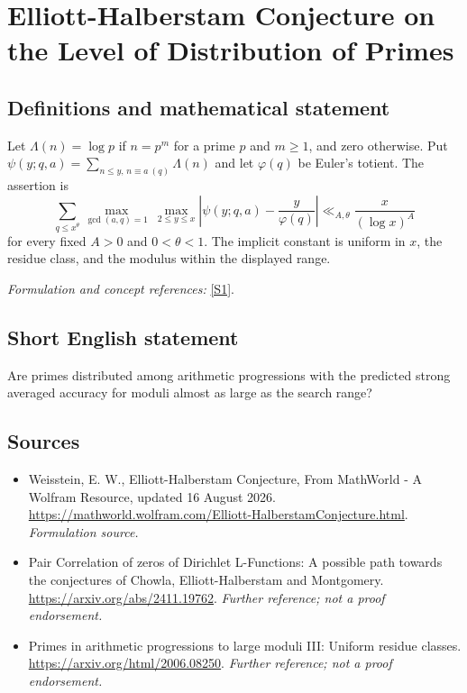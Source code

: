 \documentclass[11pt]{article}
\begin{document}
\section*{\texorpdfstring{Elliott-Halberstam Conjecture on the Level of Distribution of Primes}{Elliott-Halberstam Conjecture on the Level of Distribution of Primes}}\label{89}
\subsection{Definitions and mathematical statement}
Let $\Lambda(n)=\log p$ if $n=p^m$ for a prime $p$ and $m\ge1$, and zero otherwise. Put $\psi(y;q,a)=\sum_{n\le y,\,n\equiv a\ (q)}\Lambda(n)$ and let $\varphi(q)$ be Euler's totient. The assertion is
\[
 \sum_{q\le x^\theta}\max_{\gcd(a,q)=1}\ \max_{2\le y\le x}
 \left|\psi(y;q,a)-\frac{y}{\varphi(q)}\right|
 \ll_{A,\theta}\frac{x}{(\log x)^A}
\]
for every fixed $A>0$ and $0<\theta<1$. The implicit constant is uniform in $x$, the residue class, and the modulus within the displayed range.
\par\smallskip\textit{Formulation and concept references:} \href{https://mathworld.wolfram.com/Elliott-HalberstamConjecture.html}{[S1]}.

\subsection{Short English statement}
Are primes distributed among arithmetic progressions with the predicted strong averaged accuracy for moduli almost as large as the search range?
\subsection{Sources}
\begin{itemize}
\item[S1]Weisstein, E. W., Elliott-Halberstam Conjecture, From MathWorld - A Wolfram Resource, updated 16 August 2026.
\url{https://mathworld.wolfram.com/Elliott-HalberstamConjecture.html}.
\textit{Formulation source.}
\item[S2]Pair Correlation of zeros of Dirichlet L-Functions: A possible path towards the conjectures of Chowla, Elliott-Halberstam and Montgomery.
\url{https://arxiv.org/abs/2411.19762}.
\textit{Further reference; not a proof endorsement.}
\item[S3]Primes in arithmetic progressions to large moduli III: Uniform residue classes.
\url{https://arxiv.org/html/2006.08250}.
\textit{Further reference; not a proof endorsement.}
\end{itemize}
\end{document}
